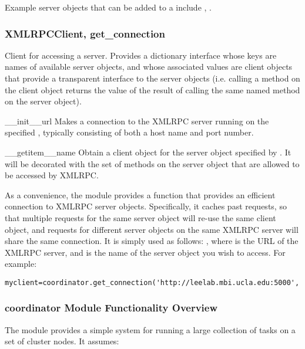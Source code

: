 \documentclass{howto}
\begin{document}
Example server objects that can be added to a 
include , .


\subsubsection{XMLRPCClient, get_connection}
Client for accessing a  server.  Provides 
a dictionary interface whose keys are names of available server objects,
and whose associated values are client objects that provide a transparent
interface to the server objects (i.e. calling a method on the client
object returns the value of the result of calling the same named method
on the server object).
\begin{funcdesc}{__init__}{url}
  Makes a connection to the XMLRPC server running on the specified ,
  typically consisting of both a host name and port number.
\end{funcdesc}
\begin{funcdesc}{__getitem__}{name}
  Obtain a client object for the server object specified by .
  It will be decorated with the set of methods on the server object
  that are allowed to be accessed by XMLRPC.
\end{funcdesc}

As a convenience, the  module provides a function
 that provides an efficient connection to XMLRPC
server objects.  Specifically, it caches past requests, so that multiple
requests for the same server object will re-use the same client object,
and requests for different server objects on the same XMLRPC server will
share the same  connection.  It is simply used as follows:
, where  is the URL of the XMLRPC
server, and  is the name of the server object you wish to access.
For example:
\begin{verbatim}
myclient=coordinator.get_connection('http://leelab.mbi.ucla.edu:5000','ucsc17')
\end{verbatim}

\subsubsection{coordinator Module Functionality Overview}

The  module provides a simple system for running a large collection of tasks on a set of cluster nodes.  It assumes:
\end{document}
